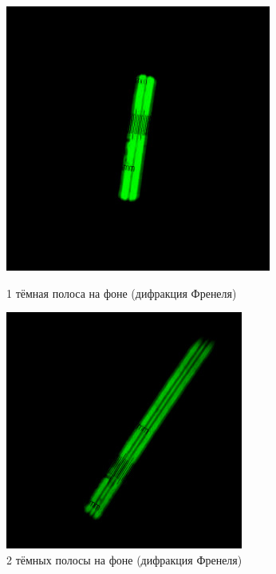 \documentclass[a4paper]{article}
\begin{document}
\begin{enumerate}
\begin{figure}[h]
\begin{center}
\begin{minipage}[h]{0.45\linewidth}
\includegraphics[width=1\linewidth]{fren_1.jpg}
\caption{1 тёмная полоса на фоне (дифракция Френеля)} %
\label{ris:experimoriginal} %
\end{minipage}
\hfill 
\begin{minipage}[h]{0.45\linewidth}
\includegraphics[width=1\linewidth]{fren_2.jpg}
\caption{2 тёмных полосы на фоне (дифракция Френеля)}
\label{ris:experimcoded}
\end{minipage}
\end{center}
\end{figure}


\end{enumerate}
\end{document}
